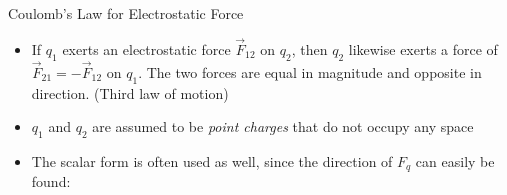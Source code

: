 \documentclass[12pt,aspectratio=169]{beamer}
\begin{document}
\begin{frame}{Coulomb's Law for Electrostatic Force}
  \begin{center}
  \end{center}
  \begin{itemize}
  \item\vspace{-.15in}If $q_1$ exerts an electrostatic force $\vec F_{12}$ on
    $q_2$, then $q_2$ likewise exerts a force of $\vec F_{21}=-\vec F_{12}$
    on $q_1$. The two forces are equal in magnitude and opposite in direction.
    (Third law of motion)
  \item $q_1$ and $q_2$ are assumed to be \emph{point charges} that do not
    occupy any space
  \item The scalar form is often used as well, since the direction of $F_q$ can
    easily be found:

  \end{itemize}
\end{frame}
\end{document}
